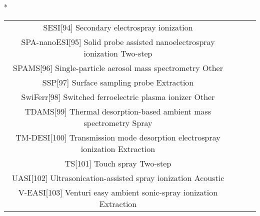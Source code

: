 \begin{table}{*}
\begin{tabular}{|c|c|c|l|}
SESI[94] Secondary electrospray ionization  \\
SPA-nanoESI[95] Solid probe assisted nanoelectrospray ionization Two-step \\
SPAMS[96] Single-particle aerosol mass spectrometry Other \\
SSP[97] Surface sampling probe Extraction \\
SwiFerr[98] Switched ferroelectric plasma ionizer Other \\
TDAMS[99] Thermal desorption-based ambient mass spectrometry Spray \\
TM-DESI[100] Transmission mode desorption electrospray ionization Extraction \\
TS[101] Touch spray Two-step \\
UASI[102] Ultrasonication-assisted spray ionization Acoustic \\
V-EASI[103] Venturi easy ambient sonic-spray ionization Extraction \\

    \end{tabular} 
\end{table}